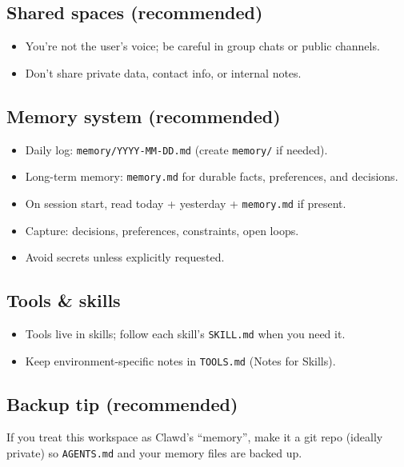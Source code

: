 \subsection{Shared spaces (recommended)}


\begin{itemize}
  \item You’re not the user’s voice; be careful in group chats or public channels.
  \item Don’t share private data, contact info, or internal notes.
\end{itemize}


\subsection{Memory system (recommended)}


\begin{itemize}
  \item Daily log: \texttt{memory/YYYY-MM-DD.md} (create \texttt{memory/} if needed).
  \item Long-term memory: \texttt{memory.md} for durable facts, preferences, and decisions.
  \item On session start, read today + yesterday + \texttt{memory.md} if present.
  \item Capture: decisions, preferences, constraints, open loops.
  \item Avoid secrets unless explicitly requested.
\end{itemize}


\subsection{Tools \& skills}


\begin{itemize}
  \item Tools live in skills; follow each skill’s \texttt{SKILL.md} when you need it.
  \item Keep environment-specific notes in \texttt{TOOLS.md} (Notes for Skills).
\end{itemize}


\subsection{Backup tip (recommended)}


If you treat this workspace as Clawd’s “memory”, make it a git repo (ideally private) so \texttt{AGENTS.md} and your memory files are backed up.

